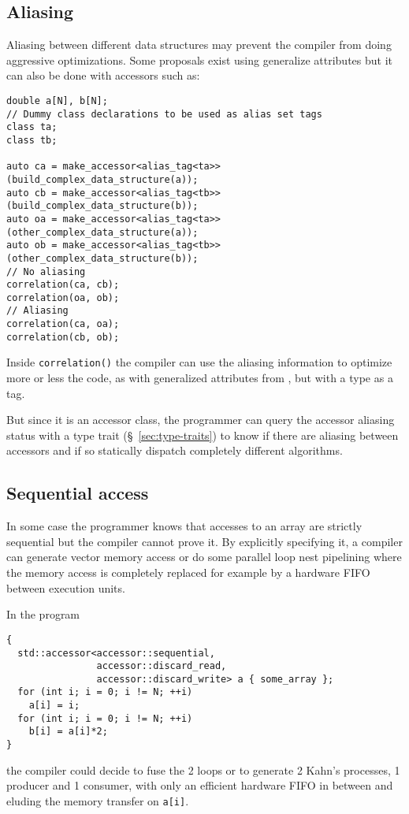 \documentclass[a4paper]{article}
\begin{document}
\subsection{Aliasing}
\label{sec:aliasing}

Aliasing between different data structures may prevent the compiler
from doing aggressive optimizations. Some proposals exist using
generalize attributes \cite{C++:N3988:aliasing} but it can also be
done with accessors such as:
\begin{lstlisting}
double a[N], b[N];
// Dummy class declarations to be used as alias set tags
class ta;
class tb;

auto ca = make_accessor<alias_tag<ta>>(build_complex_data_structure(a));
auto cb = make_accessor<alias_tag<tb>>(build_complex_data_structure(b));
auto oa = make_accessor<alias_tag<ta>>(other_complex_data_structure(a));
auto ob = make_accessor<alias_tag<tb>>(other_complex_data_structure(b));
// No aliasing
correlation(ca, cb);
correlation(oa, ob);
// Aliasing
correlation(ca, oa);
correlation(cb, ob);
\end{lstlisting}

Inside \lstinline|correlation()| the compiler can use the aliasing
information to optimize more or less the code, as with generalized
attributes from \cite{C++:N3988:aliasing}, but with a type as a tag.

But since it is an accessor class, the programmer can query the
accessor aliasing status with a type trait (\S~\ref{sec:type-traits})
to know if there are aliasing between accessors and if so statically
dispatch completely different algorithms.


\subsection{Sequential access}
\label{sec:sequential-access}

In some case the programmer knows that accesses to an array are
strictly sequential but the compiler cannot prove it. By explicitly
specifying it, a compiler can generate vector memory access or do some
parallel loop nest pipelining where the memory access is completely
replaced for example by a hardware FIFO between execution units.

In the program
\begin{lstlisting}
{
  std::accessor<accessor::sequential,
                accessor::discard_read,
                accessor::discard_write> a { some_array };
  for (int i; i = 0; i != N; ++i)
    a[i] = i;
  for (int i; i = 0; i != N; ++i)
    b[i] = a[i]*2;
}
\end{lstlisting}
the compiler could decide to fuse the 2 loops or to generate 2 Kahn's
processes, 1 producer and 1 consumer, with only an efficient hardware
FIFO in between and eluding the memory transfer on \lstinline|a[i]|.
\end{document}
